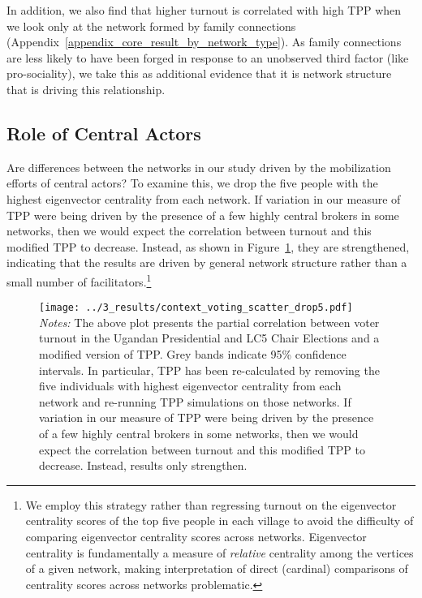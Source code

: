 \documentclass[12pt]{article}
\begin{document}

In addition, we also find that higher turnout is correlated with high TPP when we look only at the network formed by family connections (Appendix~\ref{appendix_core_result_by_network_type}). As family connections are less likely to have been forged in response to an unobserved third factor (like pro-sociality), we take this as additional evidence that it is network structure that is driving this relationship.

\subsection{Role of Central Actors}\label{section_interpretation}

Are differences between the networks in our study driven by the mobilization efforts of central actors? To examine this, we drop the five people with the highest eigenvector centrality from each network. If variation in our measure of TPP were being driven by the presence of a few highly central brokers in some networks, then we would expect the correlation between turnout and this modified TPP to decrease. Instead, as shown in Figure~\ref{figure_context_voting_scatter_drop5}, they are strengthened, indicating that the results are driven by general network structure rather than a small number of facilitators.\footnote{We employ this strategy rather than regressing turnout on the eigenvector centrality scores of the top five people in each village to avoid the difficulty of comparing eigenvector centrality scores across networks. Eigenvector centrality is fundamentally a measure of \emph{relative} centrality among the vertices of a given network, making interpretation of direct (cardinal) comparisons of centrality scores across networks problematic.}

\begin{figure}
	    \caption{}\label{figure_context_voting_scatter_drop5}
    		\texttt{[image: ../3\_results/context\_voting\_scatter\_drop5.pdf]}
	\scriptsize{\emph{Notes:}  The above plot presents the partial correlation between voter turnout in the Ugandan Presidential and LC5 Chair Elections and a modified version of TPP.  Grey bands indicate 95\% confidence intervals. In particular, TPP has been re-calculated by removing the five individuals with highest eigenvector centrality from each network and re-running TPP simulations on those networks. If variation in our measure of TPP were being driven by the presence of a few highly central brokers in some networks, then we would expect the correlation between turnout and this modified TPP to decrease. Instead, results only strengthen.}
\end{figure}
\end{document}

